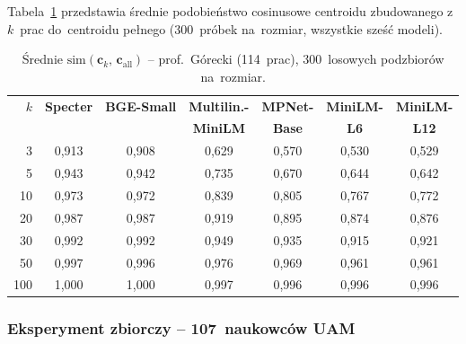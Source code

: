 Tabela~\ref{tab:gorecki} przedstawia średnie podobieństwo cosinusowe
centroidu zbudowanego z~$k$~prac do~centroidu pełnego
(300~próbek na~rozmiar, wszystkie sześć modeli).

\begin{table}[H]
\centering
\caption{Średnie $\mathrm{sim}(\mathbf{c}_k,\,\mathbf{c}_\mathrm{all})$
-- prof.~Górecki (114~prac), 300~losowych podzbiorów na~rozmiar.}
\label{tab:gorecki}
\begin{tabular}{r|cc|cccc}
\toprule
\textbf{$k$} &
\textbf{Specter} & \textbf{BGE-Small} &
\textbf{Multilin.-} & \textbf{MPNet-} & \textbf{MiniLM-} & \textbf{MiniLM-} \\
& & & \textbf{MiniLM} & \textbf{Base} & \textbf{L6} & \textbf{L12} \\
\midrule
  3  & 0{,}913 & 0{,}908 & 0{,}629 & 0{,}570 & 0{,}530 & 0{,}529 \\
  5  & 0{,}943 & 0{,}942 & 0{,}735 & 0{,}670 & 0{,}644 & 0{,}642 \\
 10  & 0{,}973 & 0{,}972 & 0{,}839 & 0{,}805 & 0{,}767 & 0{,}772 \\
 20  & 0{,}987 & 0{,}987 & 0{,}919 & 0{,}895 & 0{,}874 & 0{,}876 \\
 30  & 0{,}992 & 0{,}992 & 0{,}949 & 0{,}935 & 0{,}915 & 0{,}921 \\
 50  & 0{,}997 & 0{,}996 & 0{,}976 & 0{,}969 & 0{,}961 & 0{,}961 \\
100  & 1{,}000 & 1{,}000 & 0{,}997 & 0{,}996 & 0{,}996 & 0{,}996 \\
\bottomrule
\end{tabular}
\end{table}

\subsubsection{Eksperyment zbiorczy -- 107~naukowców UAM}


